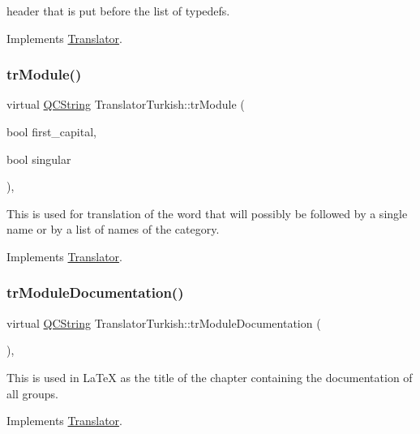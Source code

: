 header that is put before the list of typedefs. 

Implements \mbox{\hyperlink{class_translator}{Translator}}.

\mbox{\label{class_translator_turkish_aeecbc49a190bb3682f72f7f33e67e8ff}} 
\subsubsection{\texorpdfstring{trModule()}{trModule()}}
{\footnotesize\ttfamily virtual \mbox{\hyperlink{class_q_c_string}{Q\+C\+String}} Translator\+Turkish\+::tr\+Module (\begin{DoxyParamCaption}\item[{bool}]{first\+\_\+capital,  }\item[{bool}]{singular }\end{DoxyParamCaption})\hspace{0.3cm}{\ttfamily [inline]}, {\ttfamily [virtual]}}

This is used for translation of the word that will possibly be followed by a single name or by a list of names of the category. 

Implements \mbox{\hyperlink{class_translator}{Translator}}.

\mbox{\label{class_translator_turkish_aa85d4a2623d5e6912b471241feaed836}} 
\subsubsection{\texorpdfstring{trModuleDocumentation()}{trModuleDocumentation()}}
{\footnotesize\ttfamily virtual \mbox{\hyperlink{class_q_c_string}{Q\+C\+String}} Translator\+Turkish\+::tr\+Module\+Documentation (\begin{DoxyParamCaption}{ }\end{DoxyParamCaption})\hspace{0.3cm}{\ttfamily [inline]}, {\ttfamily [virtual]}}

This is used in La\+TeX as the title of the chapter containing the documentation of all groups. 

Implements \mbox{\hyperlink{class_translator}{Translator}}.

